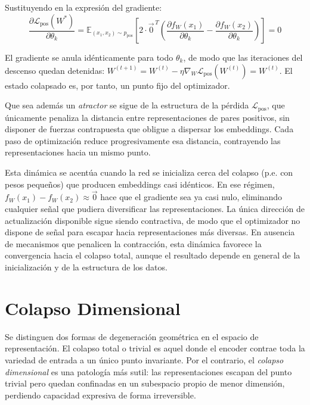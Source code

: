 Sustituyendo en la expresión del gradiente:
\begin{equation}
\frac{\partial \mathcal{L}_{\text{pos}}(W^*)}{\partial \theta_k} = \mathbb{E}_{(x_1, x_2) \sim p_{\text{pos}}} \left[ 2 \cdot \vec{0}^{\,T} \left( \frac{\partial f_W(x_1)}{\partial \theta_k} - \frac{\partial f_W(x_2)}{\partial \theta_k} \right) \right] = 0
\end{equation}

El gradiente se anula idénticamente para todo $\theta_k$, de modo que las iteraciones del descenso quedan detenidas: $W^{(t+1)} = W^{(t)} - \eta \nabla_W \mathcal{L}_{\text{pos}}(W^{(t)}) = W^{(t)}$. El estado colapsado es, por tanto, un punto fijo del optimizador.

Que sea además un \emph{atractor} se sigue de la estructura de la pérdida $\mathcal{L}_{\text{pos}}$, que únicamente penaliza la distancia entre representaciones de pares positivos, sin disponer de fuerzas contrapuesta que obligue a dispersar los embeddings. Cada paso de optimización reduce progresivamente esa distancia, contrayendo las representaciones hacia un mismo punto. 

Esta dinámica se acentúa cuando la red se inicializa cerca del colapso (p.e. con pesos pequeños) que producen embeddings casi idénticos. En ese régimen, $f_W(x_1) - f_W(x_2) \approx \vec{0}$ hace que el gradiente sea ya casi nulo, eliminando cualquier señal que pudiera diversificar las representaciones. La única dirección de actualización disponible sigue siendo contractiva, 
de modo que el optimizador no dispone de señal para escapar hacia 
representaciones más diversas. En ausencia de mecanismos que penalicen 
la contracción, esta dinámica favorece la convergencia hacia el colapso total, 
aunque el resultado depende en general de la inicialización y de la 
estructura de los datos.


\section{Colapso Dimensional}
\label{sec:colapso_dimensional_v2}

Se distinguen dos formas de degeneración geométrica en el espacio de representación. El colapso total o trivial es aquel donde el encoder contrae toda la variedad de entrada a un único punto invariante. Por el contrario, el \emph{colapso dimensional} es una patología más sutil: las representaciones escapan del punto trivial pero quedan confinadas en un subespacio propio de menor dimensión, perdiendo capacidad expresiva de forma irreversible.

